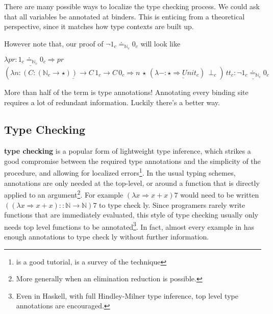 \section{\Bidir{} \SLang{}}
 
There are many possible ways to localize the type checking process.
We could ask that all variables be annotated at binders.
This is enticing from a theoretical perspective, since it matches how type contexts are built up.
 
However note that, our proof of $\lnot1_{c}\doteq_{\mathbb{N}_{c}}0_{c}$ will look like
 
$\lambda pr\underline{:1_{c}\doteq_{\mathbb{N}_{c}}0_{c}}\Rightarrow pr$
$\left(\lambda n:\underline{\left(C:\left(\mathbb{N}_{c}\rightarrow\star\right)\right)\rightarrow C\,1_{c}\rightarrow C\,0_{c}}\Rightarrow n\,\star\,(\lambda-:\underline{\star\Rightarrow Unit_{c}})\,\perp_{c}\right)\,tt_{c}:\underline{\lnot1_{c}\doteq_{\mathbb{N}_{c}}0_{c}}$
 
More than half of the term is type annotations!
Annotating every binding site requires a lot of redundant information.
Luckily there's a better way.
 
\subsection{\Bidir{} Type Checking}
 
\textbf{\Bidir{} type checking} is a popular form of lightweight type inference, which strikes a good compromise between the required type annotations and the simplicity of the procedure, and allowing for localized errors\footnote{
  \cite{christiansen2013bidirectional} is a good tutorial, \cite{10.1145/3450952} is a survey of the technique
}.
In the usual \bidir{} typing schemes, annotations are only needed at the top-level, or around a function that is directly applied to an argument\footnote{
  More generally when an elimination reduction is possible.
}.
For example $(\lambda x\Rightarrow x+x)7$ would need to be written $\left((\lambda x\Rightarrow x+x)::\mathbb{N}\rightarrow\mathbb{N}\right)7$ to type check \bidir{}ly.
Since programers rarely write functions that are immediately evaluated, this style of type checking usually only needs top level functions to be annotated\footnote{
  Even in Haskell, with full Hindley-Milner type inference, top level type annotations are encouraged.
}.
In fact, almost every example in  has enough annotations to type check \bidir{}ly without further information.
 
